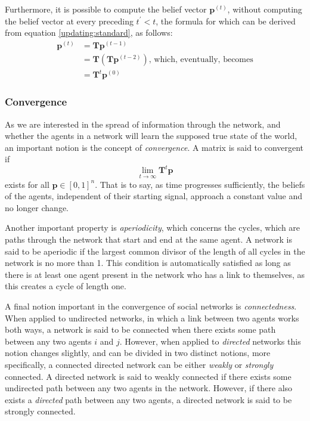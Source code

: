 \documentclass{article}
\newcommand{\T}{\textbf{T}}
\begin{document}
Furthermore, it is possible to compute the belief vector $\textbf{p}^{(t)}$, without computing the belief vector at every preceding $t^\prime < t$, the formula for which can be derived from equation \ref{updating:standard}, as follows:
\begin{align*}
    \textbf{p}^{(t)} &= \T\textbf{p}^{(t-1)} \\
    &= \T(\T\textbf{p}^{(t-2)}) \text{, which, eventually, becomes}\\
    &= \T^{t}\textbf{p}^{(0)}
\end{align*}

\newpage

\subsubsection{Convergence}
\label{convergence}
As we are interested in the spread of information through the network, and whether the agents in a network will learn the supposed true state of the world, an important notion is the concept of \emph{convergence}. A matrix  is said to convergent if
\begin{equation*}
    \lim_{t\to\infty} \T^t\textbf{p}
\end{equation*}
exists for all $\textbf{p} \in [0, 1]^n$. That is to say, as time progresses sufficiently, the beliefs of the agents, independent of their starting signal, approach a constant value and no longer change.

Another important property is \emph{aperiodicity}, which concerns the cycles, which are paths through the network that start and end at the same agent. A network is said to be aperiodic if the largest common divisor of the length of all cycles in the network is no more than 1. This condition is automatically satisfied as long as there is at least one agent present in the network who has a link to themselves, as this creates a cycle of length one.

A final notion important in the convergence of social networks is \emph{connectedness}. When applied to undirected networks, in which a link between two agents works both ways, a network is said to be connected when there exists some path between any two agents $i$ and $j$. However, when applied to \emph{directed} networks this notion changes slightly, and can be divided in two distinct notions, more specifically, a connected directed network can be either \emph{weakly} or \emph{strongly} connected. A directed network is said to weakly connected if there exists some undirected path between any two agents in the network. However, if there also exists a \emph{directed} path between any two agents, a directed network is said to be strongly connected.
\end{document}
